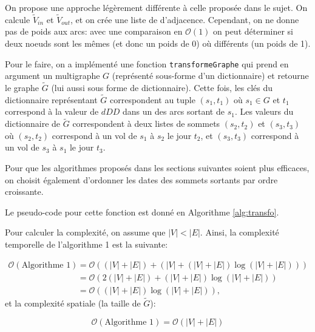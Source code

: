 On propose une approche légèrement différente à celle proposée dans le sujet. On
calcule $\tilde{V}_{in}$ et $\tilde{V}_{out}$, et on crée une liste de
d'adjacence. Cependant, on ne donne pas de poids aux arcs: avec une comparaison
en $\mathcal{O}(1)$ on peut déterminer si deux noeuds sont les mêmes (et donc un
poids de 0) où différents (un poids de 1).

Pour le faire, on a implémenté une fonction \verb|transformeGraphe| qui prend en
argument un multigraphe $G$ (représenté sous-forme d'un dictionnaire) et
retourne le graphe $\tilde{G}$ (lui aussi sous forme de dictionnaire). Cette
fois, les clés du dictionnaire représentant $\tilde{G}$ correspondent au tuple
$(s_1,t_1)$ où $s_1 \in G$ et $t_1$ correspond à la valeur de $dDD$ dans un des
arcs sortant de $s_1$. Les valeurs du dictionnaire de $\tilde{G}$ correspondent
à deux listes de sommets $(s_2,t_2)$ et $(s_3,t_3)$ où $(s_2,t_2)$ correspond à
un vol de $s_1$ à $s_2$ le jour $t_2$, et $(s_3,t_3)$ correspond à un vol de
$s_3$ à $s_1$ le jour $t_3$.

Pour que les algorithmes proposés dans les sections suivantes soient plus
efficaces, on choisit également d'ordonner les dates des sommets sortants par
ordre croissante.

Le pseudo-code pour cette fonction est donné en Algorithme \ref{alg:transfo}.


Pour calculer la complexité, on assume que $|V| < |E|$. Ainsi, la complexité
temporelle de l'algorithme 1 est la suivante:

\begin{equation}
\begin{align}
  \mathcal{O}(\text{Algorithme 1}) & = \mathcal{O}((|V| + |E|) + (|V| + (|V|+|E|) \log (|V| + |E|))) \\
                                   & = \mathcal{O}(2(|V| + |E|) + (|V|+|E|)\log(|V|+|E|)) \\
                                   & = \mathcal{O}((|V| + |E|)\log(|V|+|E|))\text{,}
\end{align}
\label{eq:8}
\end{equation}
et la complexité spatiale (la taille de $\tilde{G}$):

\begin{equation}
  \label{eq:9}
  \mathcal{O}(\text{Algorithme 1}) = \mathcal{O}(|V| + |E|)
\end{equation}

